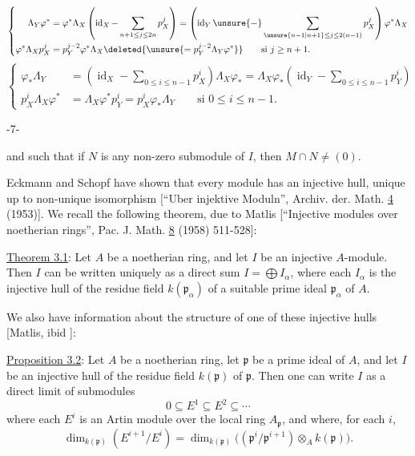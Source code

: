 \[
\left\{\begin{aligned}
\Lambda_Y\varphi^*&=\varphi^*\Lambda_X\left(\operatorname{id}_X-\sum_{n+1\leq j\leq2n}p_X^j\right)
=\left(\operatorname{id}_Y\unsure{-}\sum_{\unsure{n-1|n+1}\leq j\leq2(n-1)}p_X^j\right)\varphi^*\Lambda_X\\
\varphi^*\Lambda_Xp_X^j&=p_Y^{j-2}\varphi^*\Lambda_X\deleted{\unsure{=p_Y^{j-2}\Lambda_Y\varphi^*}}
\qquad\text{si }j\geq n+1.
\end{aligned}\right.
\]
\[
\left\{\begin{aligned}
\varphi_*\Lambda_Y&=\left(\operatorname{id}_X-\sum_{0\leq i\leq n-1}p_X^i\right)\Lambda_X\varphi_*
=\Lambda_X\varphi_*\left(\operatorname{id}_Y-\sum_{0\leq i\leq n-1}p_Y^i\right)\\
p_X^i\Lambda_X\varphi^*&=\Lambda_X\varphi^*p_Y^i=p_X^i\varphi_*\Lambda_Y\qquad\text{si }0\leq i\leq n-1.
\end{aligned}\right.
\]

\begin{center}-7-\end{center}

and such that if $N$ is any non-zero submodule of $I$, then $M\cap N\neq(0)$.

Eckmann and Schopf have shown that every module has an injective hull, unique up to non-unique isomorphism [``Uber injektive Moduln'', Archiv. der. Math. \uline{4} (1953)]. We recall the following theorem, due to Matlis [``Injective modules over noetherian rings'', Pac. J. Math. \uline{8} (1958) 511-528]:

\uline{Theorem 3.1}: Let $A$ be a noetherian ring, and let $I$ be an injective $A$-module. Then $I$ can be written uniquely as a direct sum $I=\bigoplus I_\alpha$, where each $I_\alpha$ is the injective hull of the residue field $k(\mathfrak p_\alpha)$ of a suitable prime ideal $\mathfrak p_\alpha$ of $A$.

We also have information about the structure of one of these injective hulls [Matlis, ibid ]:

\uline{Proposition 3.2}: Let $A$ be a noetherian ring, let $\mathfrak p$ be a prime ideal of $A$, and let $I$ be an injective hull of the residue field $k(\mathfrak p)$ of $\mathfrak p$. Then one can write $I$ as a direct limit of submodules
\[
0\subseteq E^1\subseteq E^2\subseteq\cdots
\]
where each $E^i$ is an Artin module over the local ring $A_{\mathfrak p}$, and where, for each $i$,
\[
\dim_{k(\mathfrak p)}(E^{i+1}/E^i)=\dim_{k(\mathfrak p)}\bigl((\mathfrak p^i/\mathfrak p^{i+1})\otimes_A k(\mathfrak p)\bigr).
\]

